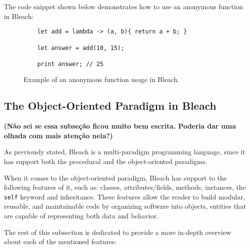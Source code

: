 The code snippet shown below demonstrates how to use an anonymous function in Bleach:

\begin{figure}[H]
    \centering
    \begin{lstlisting}
    let add = lambda -> (a, b){ return a + b; }
    
    let answer = add(10, 15);
    
    print answer; // 25
    \end{lstlisting}
    \caption{Example of an anonymous function usage in Bleach.}
\end{figure}


\subsection{The Object-Oriented Paradigm in Bleach}
\textbf{(Não sei se essa subseção ficou muito bem escrita. Poderia dar uma olhada com mais atenção nela?)}

As previously stated, Bleach is a multi-paradigm programming language, since it has support both the procedural and the object-oriented paradigms.

When it comes to the object-oriented paradigm, Bleach has support to the following features of it, such as: classes, attributes/fields, methods, instances, the \texttt{self} keyword and inheritance. These features allow the reader to build modular, reusable, and maintainable code by organizing software into objects, entities that are capable of representing both data and behavior.

The rest of this subsection is dedicated to provide a more in-depth overview about each of the mentioned features:

